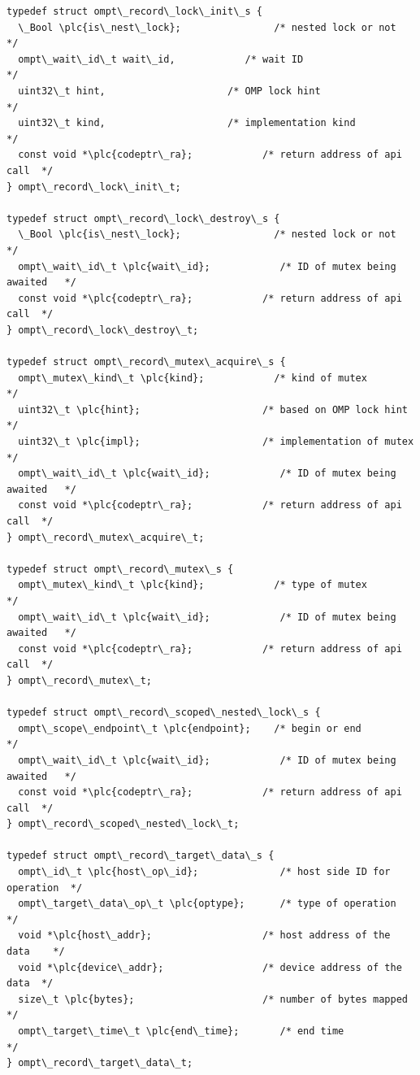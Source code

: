 \documentclass{article}
\begin{document}
\begin{boxedcode}
\begin{verbatim}
typedef struct ompt\_record\_lock\_init\_s {
  \_Bool \plc{is\_nest\_lock};                /* nested lock or not          */
  ompt\_wait\_id\_t wait\_id,            /* wait ID                     */
  uint32\_t hint,                     /* OMP lock hint               */
  uint32\_t kind,                     /* implementation kind         */
  const void *\plc{codeptr\_ra};            /* return address of api call  */          
} ompt\_record\_lock\_init\_t;

typedef struct ompt\_record\_lock\_destroy\_s {
  \_Bool \plc{is\_nest\_lock};                /* nested lock or not          */
  ompt\_wait\_id\_t \plc{wait\_id};            /* ID of mutex being awaited   */
  const void *\plc{codeptr\_ra};            /* return address of api call  */       
} ompt\_record\_lock\_destroy\_t;

typedef struct ompt\_record\_mutex\_acquire\_s {
  ompt\_mutex\_kind\_t \plc{kind};            /* kind of mutex               */
  uint32\_t \plc{hint};                     /* based on OMP lock hint      */
  uint32\_t \plc{impl};                     /* implementation of mutex     */
  ompt\_wait\_id\_t \plc{wait\_id};            /* ID of mutex being awaited   */
  const void *\plc{codeptr\_ra};            /* return address of api call  */          
} ompt\_record\_mutex\_acquire\_t;

typedef struct ompt\_record\_mutex\_s {
  ompt\_mutex\_kind\_t \plc{kind};            /* type of mutex               */
  ompt\_wait\_id\_t \plc{wait\_id};            /* ID of mutex being awaited   */
  const void *\plc{codeptr\_ra};            /* return address of api call  */       
} ompt\_record\_mutex\_t;

typedef struct ompt\_record\_scoped\_nested\_lock\_s {
  ompt\_scope\_endpoint\_t \plc{endpoint};    /* begin or end                */
  ompt\_wait\_id\_t \plc{wait\_id};            /* ID of mutex being awaited   */
  const void *\plc{codeptr\_ra};            /* return address of api call  */       
} ompt\_record\_scoped\_nested\_lock\_t;

typedef struct ompt\_record\_target\_data\_s {
  ompt\_id\_t \plc{host\_op\_id};              /* host side ID for operation  */
  ompt\_target\_data\_op\_t \plc{optype};      /* type of operation           */
  void *\plc{host\_addr};                   /* host address of the data    */
  void *\plc{device\_addr};                 /* device address of the data  */ 
  size\_t \plc{bytes};                      /* number of bytes mapped      */
  ompt\_target\_time\_t \plc{end\_time};       /* end time                    */
} ompt\_record\_target\_data\_t;


\end{verbatim}
\end{boxedcode}
\end{document}
